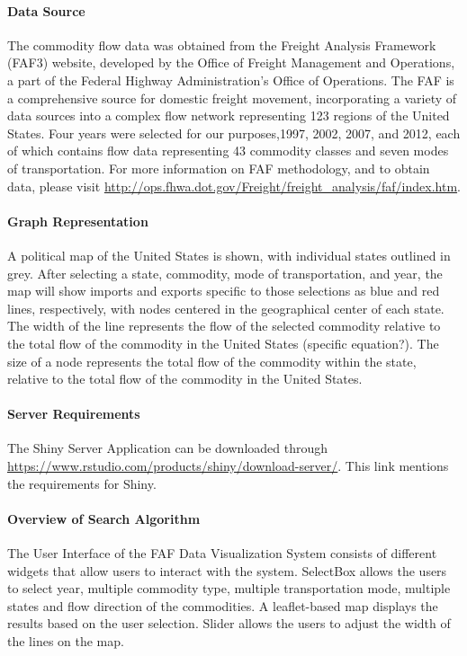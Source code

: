 \documentclass[12pt]{article}
\begin{document}
\paragraph*{Data Source}

The commodity flow data was obtained from the Freight Analysis Framework (FAF3) website, developed by the Office of Freight Management and Operations, a part of the Federal Highway Administration's Office of Operations.  The FAF is a comprehensive source for domestic freight movement, incorporating a variety of data sources into a complex flow network representing 123 regions of the United States.  Four years were selected for our purposes,1997, 2002, 2007, and 2012, each of which contains flow data representing 43 commodity classes and seven modes of transportation.  For more information on FAF methodology, and to obtain data, please visit \url{http://ops.fhwa.dot.gov/Freight/freight_analysis/faf/index.htm}.

\paragraph*{Graph Representation}

A political map of the United States is shown, with individual states outlined in grey.  After selecting a state, commodity, mode of transportation, and year, the map will show imports and exports specific to those selections as blue and red lines, respectively, with nodes centered in the geographical center of each state.  The width of the line represents the flow of the selected commodity relative to the total flow of the commodity in the United States (specific equation?).  The size of a node represents the total flow of the commodity within the state, relative to the total flow of the commodity in the United States.

\paragraph*{Server Requirements}

The Shiny Server Application can be downloaded through \url{https://www.rstudio.com/products/shiny/download-server/}.  This link mentions the requirements for Shiny.

\paragraph*{Overview of Search Algorithm}

The User Interface of the FAF Data Visualization System consists of different widgets that allow users to interact with the system. SelectBox allows the users to select year, multiple commodity type, multiple transportation mode, multiple states and flow direction of the commodities.  A leaflet-based map displays the results based on the user selection. Slider allows the users to adjust the width of the lines on the map.  
\end{document}
